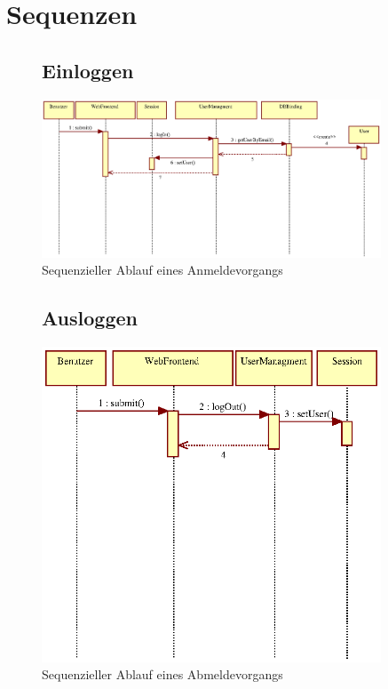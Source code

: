 \documentclass[a4paper,11pt]{scrartcl}
\begin{document}
\section{Sequenzen}
\begin{figure}[htbp]
\subsection{Einloggen}
		\centering
		\includegraphics[width=0.90\textwidth]{images/seq01_einloggen.eps}
		\caption{Sequenzieller Ablauf eines Anmeldevorgangs}
		\label{seq01}
\end{figure}

\begin{figure}[htbp]
\subsection{Ausloggen}
		\centering
		\includegraphics[width=0.90\textwidth]{images/seq02_ausloggen.eps}
		\caption{Sequenzieller Ablauf eines Abmeldevorgangs}
		\label{seq02}
\end{figure}
\end{document}
